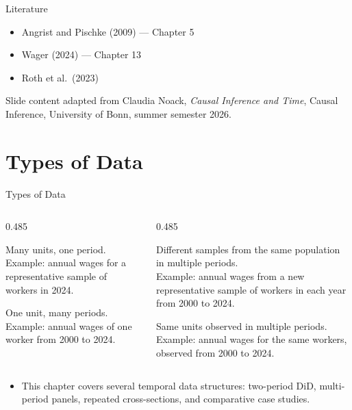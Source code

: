 \documentclass[11pt,aspectratio=169]{beamer}
\begin{document}
\begin{frame}{Literature}
\begin{itemize}
  \item Angrist and Pischke (2009) --- Chapter 5
  \item Wager (2024) --- Chapter 13
  \item Roth et al.\ (2023)
\end{itemize}
\vfill
{\footnotesize\color{MutedText}Slide content adapted from Claudia Noack, \emph{Causal Inference and Time}, Causal Inference, University of Bonn, summer semester 2026.}
\end{frame}


\section{Types of Data}

\begin{frame}{Types of Data}
\small
\begin{columns}[T,onlytextwidth]
\begin{column}{0.485\textwidth}
\begin{definitionbox}
Many units, one period.\\
{\footnotesize\color{MutedText}Example: annual wages for a representative sample of workers in 2024.}
\end{definitionbox}
\begin{definitionbox}
One unit, many periods.\\
{\footnotesize\color{MutedText}Example: annual wages of one worker from 2000 to 2024.}
\end{definitionbox}
\end{column}
\begin{column}{0.485\textwidth}
\begin{definitionbox}
Different samples from the same population in multiple periods.\\
{\footnotesize\color{MutedText}Example: annual wages from a new representative sample of workers in each year from 2000 to 2024.}
\end{definitionbox}
\begin{definitionbox}
Same units observed in multiple periods.\\
{\footnotesize\color{MutedText}Example: annual wages for the same workers, observed from 2000 to 2024.}
\end{definitionbox}
\end{column}
\end{columns}
\begin{itemize}
  \item This chapter covers several temporal data structures: two-period DiD, multi-period panels, repeated cross-sections, and comparative case studies.
\end{itemize}
\end{frame}
\end{document}
